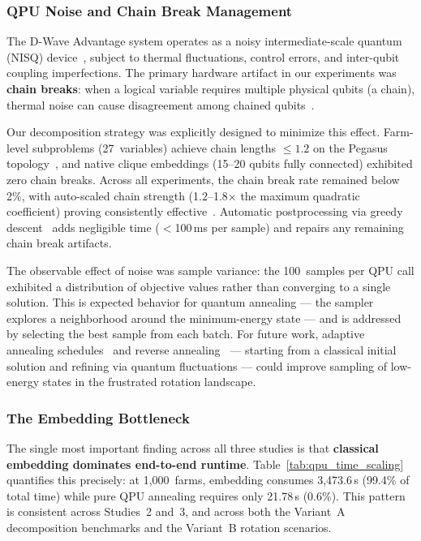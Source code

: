 \subsubsection{QPU Noise and Chain Break Management}

The D-Wave Advantage system operates as a noisy intermediate-scale quantum (NISQ) device~\cite{preskillQuantumComputingNISQ2018, boothby2020next}, subject to thermal fluctuations, control errors, and inter-qubit coupling imperfections. The primary hardware artifact in our experiments was \textbf{chain breaks}: when a logical variable requires multiple physical qubits (a chain), thermal noise can cause disagreement among chained qubits~\cite{choi2008minor}.

Our decomposition strategy was explicitly designed to minimize this effect. Farm-level subproblems (27~variables) achieve chain lengths $\leq 1.2$ on the Pegasus topology~\cite{boothby2020next}, and native clique embeddings (15--20 qubits fully connected) exhibited zero chain breaks. Across all experiments, the chain break rate remained below 2\%, with auto-scaled chain strength (1.2--1.8$\times$ the maximum quadratic coefficient) proving consistently effective~\cite{venturelli2015quantum}. Automatic postprocessing via greedy descent~\cite{cai2014practical} adds negligible time ($<$100\,ms per sample) and repairs any remaining chain break artifacts.

The observable effect of noise was sample variance: the 100~samples per QPU call exhibited a distribution of objective values rather than converging to a single solution. This is expected behavior for quantum annealing --- the sampler explores a neighborhood around the minimum-energy state --- and is addressed by selecting the best sample from each batch. For future work, adaptive annealing schedules~\cite{marshall2019power, king2022coherent} and reverse annealing~\cite{venturelli2019reverse} --- starting from a classical initial solution and refining via quantum fluctuations --- could improve sampling of low-energy states in the frustrated rotation landscape.

\subsubsection{The Embedding Bottleneck}

The single most important finding across all three studies is that \textbf{classical embedding dominates end-to-end runtime}. Table~\ref{tab:qpu_time_scaling} quantifies this precisely: at 1,000~farms, embedding consumes 3,473.6\,s (99.4\% of total time) while pure QPU annealing requires only 21.78\,s (0.6\%). This pattern is consistent across Studies~2 and~3, and across both the Variant~A decomposition benchmarks and the Variant~B rotation scenarios.

